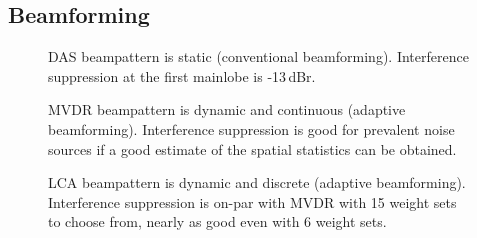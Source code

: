 {\subsection{Beamforming}

\begin{figure}[tp]\label{2_fig_scenario_das}
\caption{DAS beampattern is static (conventional beamforming). Interference suppression at the first mainlobe is -13\,dBr.}
\end{figure}

\begin{figure}[tp]\label{2_fig_scenario_mvdr}
\caption{MVDR beampattern is dynamic and continuous (adaptive beamforming). Interference suppression is good for prevalent noise sources if a good estimate of the spatial statistics can be obtained.}
\end{figure}

\begin{figure}[tp]\label{2_fig_scenario_lca}
\caption{LCA beampattern is dynamic and discrete (adaptive beamforming). Interference suppression is on-par with MVDR with 15 weight sets to choose from, nearly as good even with 6 weight sets.}
\end{figure}

}
